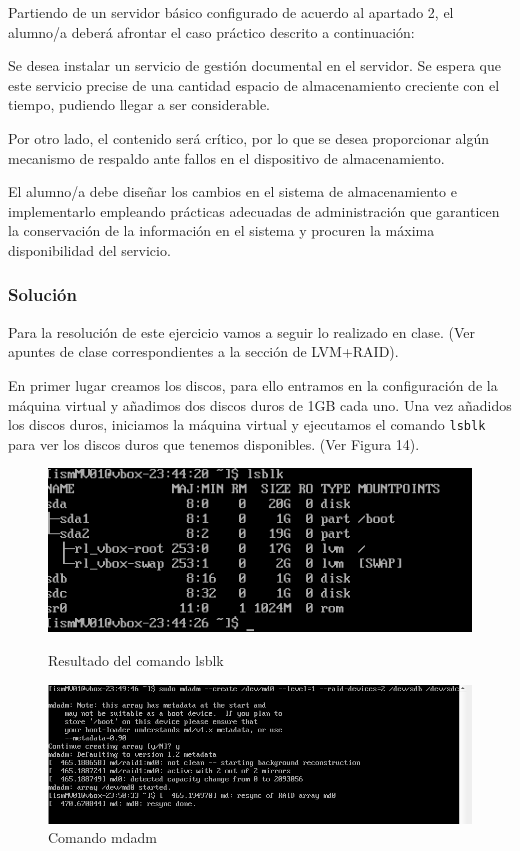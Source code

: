 Partiendo de un servidor básico configurado de acuerdo al apartado 2, el alumno/a deberá
afrontar el caso práctico descrito a continuación:

Se desea instalar un servicio de gestión documental en el servidor. Se espera que este servicio
precise de una cantidad espacio de almacenamiento creciente con el tiempo, pudiendo llegar a
ser considerable.

Por otro lado, el contenido será crítico, por lo que se desea proporcionar
algún mecanismo de respaldo ante fallos en el dispositivo de almacenamiento.

El alumno/a debe diseñar los cambios en el sistema de almacenamiento e implementarlo
empleando prácticas adecuadas de administración que garanticen la conservación de la
información en el sistema y procuren la máxima disponibilidad del servicio.

\subsubsection{Solución}

Para la resolución de este ejercicio vamos a seguir lo realizado en clase. (Ver apuntes de clase correspondientes a la sección de LVM+RAID).

En primer lugar creamos los discos, para ello entramos en la configuración de la máquina virtual y añadimos dos discos duros de 1GB cada uno. Una vez añadidos los discos duros, iniciamos la máquina virtual y ejecutamos el comando \texttt{lsblk} para ver los discos duros que tenemos disponibles. (Ver Figura 14).

\begin{figure}[htbp]
  \centering
  \begin{minipage}[b]{0.45\textwidth}
      \centering
      \includegraphics[width=\textwidth]{images/Bloque1/lsblk.png}
      \caption{Resultado del comando lsblk}
  \end{minipage}
  \hfill
  \begin{minipage}[b]{0.45\textwidth}
      \centering
      \includegraphics[width=\textwidth]{images/Bloque1/mdadm.png}
      \caption{Comando mdadm}
  \end{minipage}
\end{figure}

